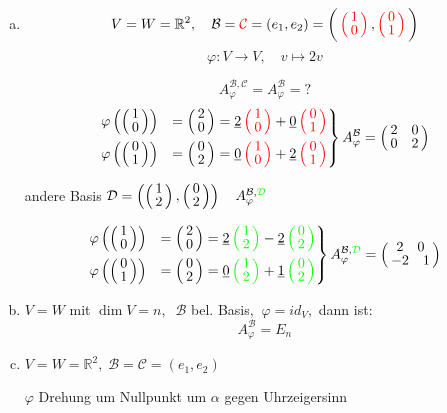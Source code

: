 \begin{enumerate}[a)]
	\item
	\[V=W=\mathbb{R}^2, \quad \mathcal{B}=\mathcal{\color{red}C\color{black}}=(e_1,e_2) =
	\bigg ( \color{red}\weirdvct{1}{0}\color{black},\color{red}\weirdvct{0}{1}\color{black}\bigg )\]
	\[\varphi: V \rightarrow V, \quad v \mapsto 2v\]
	
	\[A_\varphi^{\mathcal{B},\mathcal{C}} = A_\varphi^{\mathcal{B}} = \text{?}\]
	\begin{align*}
	\begin{rcases}
	\varphi\left(\weirdvct{1}{0}\right) &= \weirdvct{2}{0} = \underline{2} \color{red}\weirdvct{1}{0}\color{black} +
	\underline{0} \color{red}\weirdvct{0}{1}\color{black}\\
	\varphi\left(\weirdvct{0}{1}\right) &= \weirdvct{0}{2} = \underline{0} \color{red}\weirdvct{1}{0}\color{black} +
	\underline{2} \color{red}\weirdvct{0}{1}\color{black}\\
	\end{rcases}
	A_\varphi^\mathcal{B} = \weirdvct{2\quad0}{0\quad2}
	\end{align*}
	
	andere Basis $\mathcal{D} = \left( \weirdvct{1}{2},\weirdvct{0}{2}\right) \quad
	A_\varphi^{\mathcal{B},\color{green}\mathcal{D}\color{black}}$
	
	\begin{align*}
	\begin{rcases}
	\varphi\left(\weirdvct{1}{0}\right) &= \weirdvct{2}{0} = \underline{2} \color{green}\weirdvct{1}{2}\color{black} -
	\underline{2} \color{green}\weirdvct{0}{2}\color{black}\\
	\varphi\left(\weirdvct{0}{1}\right) &= \weirdvct{0}{2} = \underline{0} \color{green}\weirdvct{1}{2}\color{black} +
	\underline{1} \color{green}\weirdvct{0}{2}\color{black}\\
	\end{rcases}
	A_\varphi^{\mathcal{B},\color{green}\mathcal{D}\color{black}} = \weirdvct{2\quad0}{-2\quad1}
	\end{align*}
	
	\item
	$V = W$ mit $\dim V = n,\;\; \mathcal{B}$ bel. Basis,$\;\; \varphi = id_V,$ dann ist: \[A_\varphi^\mathcal{B} = E_n\]
	
	\item
	$V = W = \mathbb{R}^2,\; \mathcal{B} = \mathcal{C}= (e_1,e_2)$
		
	$\varphi$ Drehung um Nullpunkt um $\alpha$ gegen Uhrzeigersinn
	

\end{enumerate}
